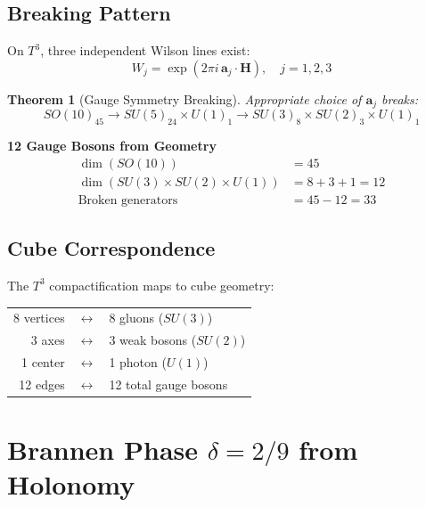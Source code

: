 \documentclass[12pt,a4paper]{article}
\newtheorem{theorem}{Theorem}[section]
\theoremstyle{definition}
\theoremstyle{remark}
\newcommand{\Tthree}{T^3}
\begin{document}
\subsection{Breaking Pattern}

On $\Tthree$, three independent Wilson lines exist:
\begin{equation}
W_j = \exp(2\pi i \, \mathbf{a}_j \cdot \mathbf{H}), \quad j = 1, 2, 3
\end{equation}

\begin{theorem}[Gauge Symmetry Breaking]
Appropriate choice of $\mathbf{a}_j$ breaks:
\begin{equation}
\boxed{SO(10)_{45} \to SU(5)_{24} \times U(1)_1 \to SU(3)_8 \times SU(2)_3 \times U(1)_1}
\end{equation}
\end{theorem}

\begin{keyresult}
\textbf{12 Gauge Bosons from Geometry}
\begin{align}
\dim(SO(10)) &= 45 \\
\dim(SU(3) \times SU(2) \times U(1)) &= 8 + 3 + 1 = 12 \\
\text{Broken generators} &= 45 - 12 = 33
\end{align}
\end{keyresult}

\subsection{Cube Correspondence}

The $\Tthree$ compactification maps to cube geometry:
\begin{center}
\begin{tabular}{rcl}
8 vertices & $\leftrightarrow$ & 8 gluons ($SU(3)$) \\
3 axes & $\leftrightarrow$ & 3 weak bosons ($SU(2)$) \\
1 center & $\leftrightarrow$ & 1 photon ($U(1)$) \\
12 edges & $\leftrightarrow$ & 12 total gauge bosons
\end{tabular}
\end{center}

\section{Brannen Phase $\delta = 2/9$ from Holonomy}
\label{sec:brannen}
\end{document}
